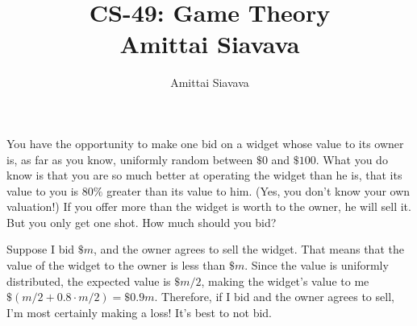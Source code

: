 \documentclass[11pt, reqno]{amsart}
\begin{document}

\title{CS-49: Game Theory\\ Amittai Siavava \\ }
\author{Amittai Siavava}


\setlength{\headheight}{13.0pt}
\setlength{\footskip}{15.0pt}

\maketitle

\bigskip

\def \cram { \textsc{cram} }
\def \dom { \textsc{domineering} }
\def \sub { \textsc{subtraction} }
\def \weighted { \textsc{weighted odds and evens}}
\def \nim { \textsc{nim} }
\def \P { \mathbf{P}}
\def \N { \mathbf{N}}
\def \cc { \mathbf{cc} }
\def \hackenbush { \textsc{LR hackenbush} }
\def \clobber { \textsc{clobber} }

  \begin{problem}[24]
    You have the opportunity to make one bid on a widget whose value to its owner is,
    as far as you know, uniformly random between $\$0$ and $\$100$.
    What you do know is that you are so much better at operating the widget than he is,
    that its value to you is $80\%$ greater than its value to him.
    (Yes, you don't know your own valuation!)
    If you offer more than the widget is worth to the owner, he will sell it.
    But you only get one shot. How much should you bid?

    \step
    Suppose I bid $\$m$, and the owner agrees to sell the widget.
    That means that the value of the widget to the owner is less than $\$m$.
    Since the value is uniformly distributed, the expected value is $\$m/2$,
    making the widget's value to me $\$(m/2 + 0.8 \cdot m/2) = \$0.9m$.
    Therefore, if I bid and the owner agrees to sell, I'm most certainly making a loss!
    It's best to not bid.
  \end{problem}
\end{document}
